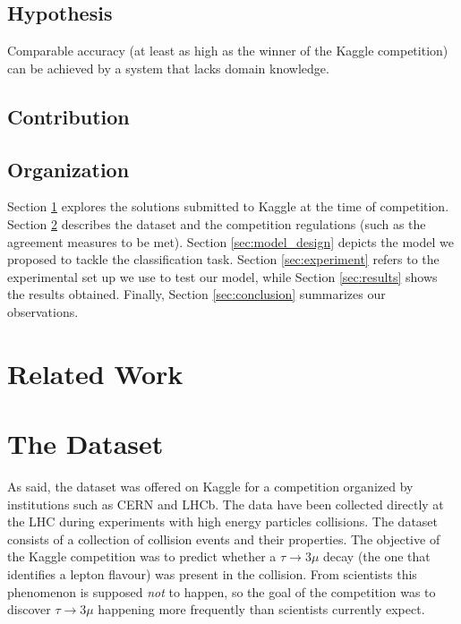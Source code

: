 \documentclass[conference]{IEEEtran}
\begin{document}
\subsection{Hypothesis}
\label{sec:hypothesis}
Comparable accuracy (at least as high as the winner of the Kaggle competition) can be achieved by a system that lacks domain knowledge.

\subsection{Contribution}


\subsection{Organization}
Section \ref{sec:related_work} explores the solutions submitted to Kaggle at the time of competition. Section \ref{sec:dataset} describes the dataset and the competition regulations (such as the agreement measures to be met). Section \ref{sec:model_design} depicts the model we proposed to tackle the classification task. Section \ref{sec:experiment} refers to the experimental set up we use to test our model, while Section \ref{sec:results} shows the results obtained. Finally, Section \ref{sec:conclusion} summarizes our observations.


\section{Related Work}
\label{sec:related_work}



\section{The Dataset}
\label{sec:dataset}
As said, the dataset was offered on Kaggle for a competition organized by
institutions such as CERN and LHCb. The data have been collected directly at the
LHC during experiments with high energy particles collisions. The dataset
consists of a collection of collision events and their properties. The objective
of the Kaggle competition was to predict whether a $\tau \rightarrow 3\mu$ decay
(the one that identifies a lepton flavour) was present in the collision. From
scientists this phenomenon is supposed \emph{not} to happen, so the goal of the
competition was to discover $\tau \rightarrow 3\mu$ happening more frequently
than scientists currently expect.
\end{document}
